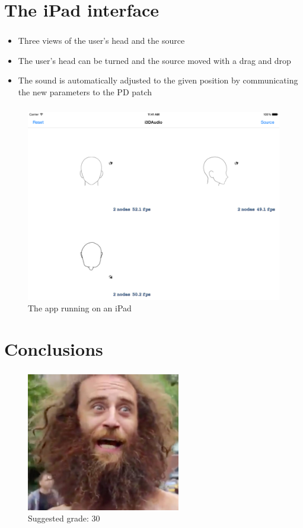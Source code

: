 \documentclass{beamer}
\begin{document}
	\section{The iPad interface}

	\begin{frame}
		\frametitle{\insertsection}
		\begin{itemize}
			\item Three views of the user's head and the source
			\item The user's head can be turned and the source moved with a drag and drop
			\item The sound is automatically adjusted to the given position by communicating the
				new parameters to the PD patch
		\end{itemize}
	\end{frame}

	\begin{frame}
		\frametitle{\insertsection}
		\begin{figure}
			\centering
			\includegraphics[width=1.0\textheight]{images/iOS_screenshot_0.png}
			\caption{The app running on an iPad}
			\label{fig:ios_app}
		\end{figure}
	\end{frame}

	\section*{Conclusions}

	\begin{frame}
		\frametitle{\insertsection}
		\begin{figure}
			\centering
			\includegraphics[width=0.6\textwidth]{images/alas.jpg}
            \caption{Suggested grade: 30}
		\end{figure}
	\end{frame}
\end{document}
